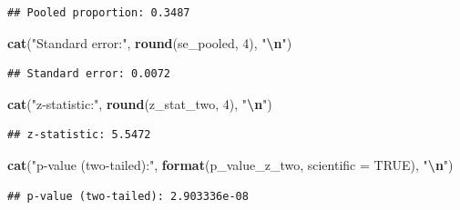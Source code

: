 \documentclass[
  12pt,
]{article}
\newenvironment{Shaded}{\begin{snugshade}}{\end{snugshade}}
\newcommand{\AttributeTok}[1]{\textcolor[rgb]{0.13,0.29,0.53}{#1}}
\newcommand{\ConstantTok}[1]{\textcolor[rgb]{0.56,0.35,0.01}{#1}}
\newcommand{\DecValTok}[1]{\textcolor[rgb]{0.00,0.00,0.81}{#1}}
\newcommand{\FunctionTok}[1]{\textcolor[rgb]{0.13,0.29,0.53}{\textbf{#1}}}
\newcommand{\NormalTok}[1]{#1}
\newcommand{\SpecialCharTok}[1]{\textcolor[rgb]{0.81,0.36,0.00}{\textbf{#1}}}
\newcommand{\StringTok}[1]{\textcolor[rgb]{0.31,0.60,0.02}{#1}}
\begin{document}
\begin{verbatim}
## Pooled proportion: 0.3487
\end{verbatim}

\begin{Shaded}
\begin{Highlighting}[]
\FunctionTok{cat}\NormalTok{(}\StringTok{"Standard error:"}\NormalTok{, }\FunctionTok{round}\NormalTok{(se\_pooled, }\DecValTok{4}\NormalTok{), }\StringTok{"}\SpecialCharTok{\textbackslash{}n}\StringTok{"}\NormalTok{)}
\end{Highlighting}
\end{Shaded}

\begin{verbatim}
## Standard error: 0.0072
\end{verbatim}

\begin{Shaded}
\begin{Highlighting}[]
\FunctionTok{cat}\NormalTok{(}\StringTok{"z{-}statistic:"}\NormalTok{, }\FunctionTok{round}\NormalTok{(z\_stat\_two, }\DecValTok{4}\NormalTok{), }\StringTok{"}\SpecialCharTok{\textbackslash{}n}\StringTok{"}\NormalTok{)}
\end{Highlighting}
\end{Shaded}

\begin{verbatim}
## z-statistic: 5.5472
\end{verbatim}

\begin{Shaded}
\begin{Highlighting}[]
\FunctionTok{cat}\NormalTok{(}\StringTok{"p{-}value (two{-}tailed):"}\NormalTok{, }\FunctionTok{format}\NormalTok{(p\_value\_z\_two, }\AttributeTok{scientific =} \ConstantTok{TRUE}\NormalTok{),}
    \StringTok{"}\SpecialCharTok{\textbackslash{}n}\StringTok{"}\NormalTok{)}
\end{Highlighting}
\end{Shaded}

\begin{verbatim}
## p-value (two-tailed): 2.903336e-08
\end{verbatim}
\end{document}
